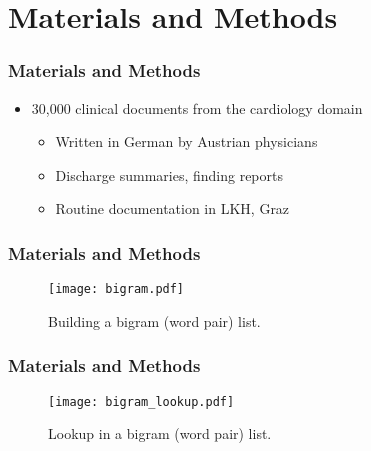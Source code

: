 \section{Materials and Methods}


\begin{frame}
	\frametitle{Materials and Methods}
	\begin{itemize} \myspacing
		\item 30,000 clinical documents from the cardiology domain
		\begin{itemize}
			\item Written in German by Austrian physicians
			\item Discharge summaries, finding reports        
                         \item Routine documentation in LKH, Graz
                \end{itemize}

	\end{itemize}
\end{frame}

\begin{frame}
	\frametitle{Materials and Methods}
                \begin{figure}
        			\centering
        			\texttt{[image: bigram.pdf]}
        			\caption{Building a bigram (word pair) list.}
        			\label{fig:bigram_extraction}
  		\end{figure}
\end{frame}

\begin{frame}
	\frametitle{Materials and Methods}
                \begin{figure}
        			\centering
        			\texttt{[image: bigram\_lookup.pdf]}
        			\caption{Lookup in a bigram (word pair) list.}
        			\label{fig:bigram_lookup}
  		\end{figure}
\end{frame}

